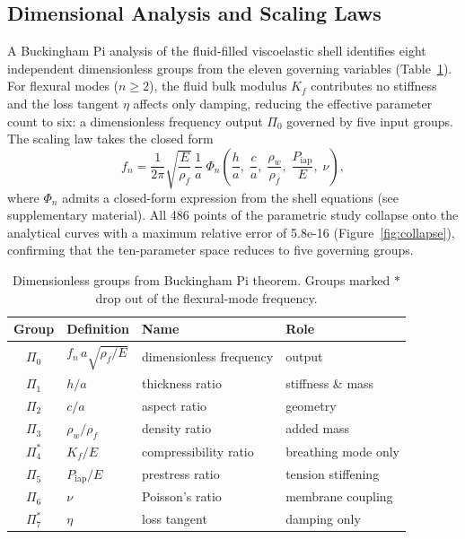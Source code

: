 \subsection{Dimensional Analysis and Scaling Laws}
\label{sec:dimensional}

A Buckingham Pi analysis of the fluid-filled viscoelastic shell identifies
eight independent dimensionless groups from the eleven governing variables
(Table~\ref{tab:pi_groups}).  For flexural modes ($n \ge 2$), the fluid bulk
modulus $K_f$ contributes no stiffness and the loss tangent $\eta$ affects
only damping, reducing the effective parameter count to six: a dimensionless
frequency output $\Pi_0$ governed by five input groups.  The scaling law
takes the closed form
\begin{equation}
  f_n = \frac{1}{2\pi}\sqrt{\frac{E}{\rho_f}}\,\frac{1}{a}\;
        \Phi_n\!\left(\frac{h}{a},\;\frac{c}{a},\;
        \frac{\rho_w}{\rho_f},\;\frac{P_\mathrm{iap}}{E},\;\nu\right),
  \label{eq:scaling_law}
\end{equation}
where $\Phi_n$ admits a closed-form expression from the shell equations
(see supplementary material).  All 486 points of the parametric study
collapse onto the analytical curves with a maximum relative error of
5.8e-16 (Figure~\ref{fig:collapse}), confirming that the ten-parameter
space reduces to five governing groups.

\begin{table}[htbp]
  \centering
  \caption{Dimensionless groups from Buckingham Pi theorem.  Groups marked
  $\ast$ drop out of the flexural-mode frequency.}
  \label{tab:pi_groups}
  \begin{tabular}{clll}
    \hline
    Group & Definition & Name & Role \\
    \hline
    $\Pi_0$ & $f_n\, a\sqrt{\rho_f/E}$ & dimensionless frequency & output \\
    $\Pi_1$ & $h/a$ & thickness ratio & stiffness \& mass \\
    $\Pi_2$ & $c/a$ & aspect ratio & geometry \\
    $\Pi_3$ & $\rho_w/\rho_f$ & density ratio & added mass \\
    $\Pi_4^\ast$ & $K_f/E$ & compressibility ratio & breathing mode only \\
    $\Pi_5$ & $P_\mathrm{iap}/E$ & prestress ratio & tension stiffening \\
    $\Pi_6$ & $\nu$ & Poisson's ratio & membrane coupling \\
    $\Pi_7^\ast$ & $\eta$ & loss tangent & damping only \\
    \hline
  \end{tabular}
\end{table}

